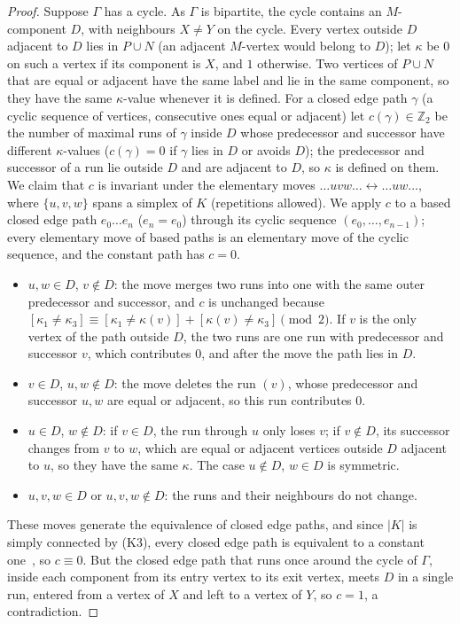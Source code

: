 \documentclass[11pt,letterpaper]{article}
\theoremstyle{definition}
\newcommand{\Z}{\mathbb{Z}}
\begin{document}
\begin{proof}
Suppose $\Gamma$ has a cycle. As $\Gamma$ is bipartite, the cycle contains an $M$-component $D$,
with neighbours $X\ne Y$ on the cycle. Every vertex outside $D$ adjacent to $D$ lies in $P\cup N$
(an adjacent $M$-vertex would belong to $D$); let $\kappa$ be $0$ on such a vertex if its component
is $X$, and $1$ otherwise. Two vertices of $P\cup N$ that are equal or adjacent have the same label
and lie in the same component, so they have the same $\kappa$-value whenever it is defined. For a
closed edge path $\gamma$ (a cyclic sequence of vertices, consecutive ones equal or adjacent) let
$c(\gamma)\in\Z_2$ be the number of maximal runs of $\gamma$ inside $D$ whose predecessor and
successor have different $\kappa$-values ($c(\gamma)=0$ if $\gamma$ lies in $D$ or avoids $D$); the
predecessor and successor of a run lie outside $D$ and are adjacent to $D$, so $\kappa$ is defined on
them. We claim that $c$ is invariant under the elementary moves
$\dots uvw\dots\leftrightarrow\dots uw\dots$, where $\{u,v,w\}$ spans a simplex of $K$ (repetitions
allowed). We apply $c$ to a based closed edge path $e_0\dots e_n$ ($e_n=e_0$) through its cyclic
sequence $(e_0,\dots,e_{n-1})$; every elementary move of based paths is an elementary move of the
cyclic sequence, and the constant path has $c=0$.
\begin{itemize}[itemsep=0pt]
\item $u,w\in D$, $v\notin D$: the move merges two runs into one with the same outer predecessor and
successor, and $c$ is unchanged because
$[\kappa_1\ne\kappa_3]\equiv[\kappa_1\ne\kappa(v)]+[\kappa(v)\ne\kappa_3]\pmod2$. If $v$ is the only
vertex of the path outside $D$, the two runs are one run with predecessor and successor $v$, which
contributes $0$, and after the move the path lies in $D$.
\item $v\in D$, $u,w\notin D$: the move deletes the run $(v)$, whose predecessor and successor $u,w$
are equal or adjacent, so this run contributes $0$.
\item $u\in D$, $w\notin D$: if $v\in D$, the run through $u$ only loses $v$; if $v\notin D$, its
successor changes from $v$ to $w$, which are equal or adjacent vertices outside $D$ adjacent to $u$,
so they have the same $\kappa$. The case $u\notin D$, $w\in D$ is symmetric.
\item $u,v,w\in D$ or $u,v,w\notin D$: the runs and their neighbours do not change.
\end{itemize}
These moves generate the equivalence of closed edge paths, and since $|K|$ is simply connected by
(K3), every closed edge path is equivalent to a constant one~\cite[Chapter~3, Section~6]{Spa66}, so
$c\equiv0$. But the closed edge path that runs once around the cycle of $\Gamma$, inside each
component from its entry vertex to its exit vertex, meets $D$ in a single run, entered from a vertex
of $X$ and left to a vertex of $Y$, so $c=1$, a contradiction.
\end{proof}
\end{document}
